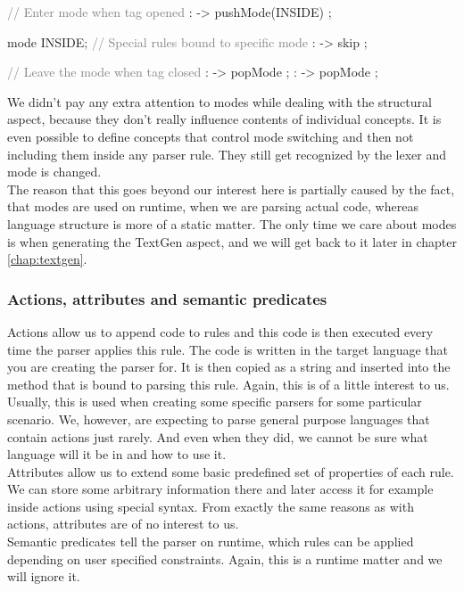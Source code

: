 \begin{antlr}
	\textcolor{gray}{// Enter mode when tag opened}
	        :   \literal{<}       -> pushMode(INSIDE) ;

	mode INSIDE;
	\textcolor{gray}{// Special rules bound to specific mode}
	           :    -> skip ;

	\textcolor{gray}{// Leave the mode when tag closed}
	       :   \literal{>}       -> popMode ;
	 :   \literal{/>}      -> popMode ;
\end{antlr}

We didn't pay any extra attention to modes while dealing with the structural aspect, because they don't really influence contents of individual concepts.
It is even possible to define concepts that control mode switching and then not including them inside any parser rule.
They still get recognized by the lexer and mode is changed.
\\

The reason that this goes beyond our interest here is partially caused by the fact, that modes are used on runtime, when we are parsing actual code, whereas language structure is more of a static matter.
The only time we care about modes is when generating the TextGen aspect, and we will get back to it later in chapter \ref{chap:textgen}.

\subsubsection{Actions, attributes and semantic predicates}

Actions allow us to append code to rules and this code is then executed every time the parser applies this rule.
The code is written in the target language that you are creating the parser for.
It is then copied as a string and inserted into the method that is bound to parsing this rule.
Again, this is of a little interest to us.
Usually, this is used when creating some specific parsers for some particular scenario.
We, however, are expecting to parse general purpose languages that contain actions just rarely.
And even when they did, we cannot be sure what language will it be in and how to use it.
\\

Attributes allow us to extend some basic predefined set of properties of each rule.
We can store some arbitrary information there and later access it for example inside actions using special syntax.
From exactly the same reasons as with actions, attributes are of no interest to us.
\\

Semantic predicates tell the parser on runtime, which rules can be applied depending on user specified constraints.
Again, this is a runtime matter and we will ignore it.
